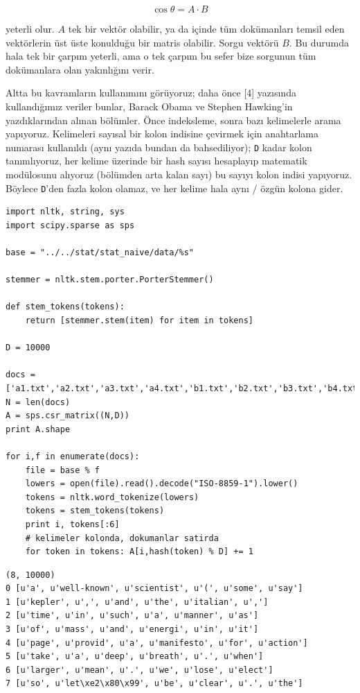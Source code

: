 \documentclass[12pt,fleqn]{article}\usepackage{../../common}
\begin{document}
$$
\cos\theta = A \cdot B
$$

yeterli olur. $A$ tek bir vektör olabilir, ya da içinde tüm dokümanları temsil
eden vektörlerin üst üste konulduğu bir matris olabilir. Sorgu vektörü $B$. Bu
durumda hala tek bir çarpım yeterli, ama o tek çarpım bu sefer bize sorgunun tüm
dokümanlara olan yakınlığını verir.

Altta bu kavramların kullanımını görüyoruz; daha önce [4] yazısında
kullandığımız veriler bunlar, Barack Obama ve Stephen Hawking'in
yazdıklarından alınan bölümler. Önce indeksleme, sonra bazı kelimelerle
arama yapıyoruz. Kelimeleri sayısal bir kolon indisine çevirmek için
anahtarlama numarası kullanıldı (aynı yazıda bundan da bahsediliyor);
\verb!D!  kadar kolon tanımlıyoruz, her kelime üzerinde bir hash sayısı
hesaplayıp matematik modülosunu alıyoruz (bölümden arta kalan sayı) bu
sayıyı kolon indisi yapıyoruz. Böylece \verb!D!'den fazla kolon olamaz, ve
her kelime hala aynı / özgün kolona gider.

\begin{verbatim}
import nltk, string, sys      
import scipy.sparse as sps

base = "../../stat/stat_naive/data/%s"

stemmer = nltk.stem.porter.PorterStemmer()

def stem_tokens(tokens):
    return [stemmer.stem(item) for item in tokens]

D = 10000

docs = ['a1.txt','a2.txt','a3.txt','a4.txt','b1.txt','b2.txt','b3.txt','b4.txt']
N = len(docs)
A = sps.csr_matrix((N,D))
print A.shape

for i,f in enumerate(docs):
    file = base % f
    lowers = open(file).read().decode("ISO-8859-1").lower()
    tokens = nltk.word_tokenize(lowers)
    tokens = stem_tokens(tokens)    
    print i, tokens[:6]
    # kelimeler kolonda, dokumanlar satirda
    for token in tokens: A[i,hash(token) % D] += 1 
\end{verbatim}

\begin{verbatim}
(8, 10000)
0 [u'a', u'well-known', u'scientist', u'(', u'some', u'say']
1 [u'kepler', u',', u'and', u'the', u'italian', u',']
2 [u'time', u'in', u'such', u'a', u'manner', u'as']
3 [u'of', u'mass', u'and', u'energi', u'in', u'it']
4 [u'page', u'provid', u'a', u'manifesto', u'for', u'action']
5 [u'take', u'a', u'deep', u'breath', u'.', u'when']
6 [u'larger', u'mean', u'.', u'we', u'lose', u'elect']
7 [u'so', u'let\xe2\x80\x99', u'be', u'clear', u'.', u'the']
\end{verbatim}
\end{document}
